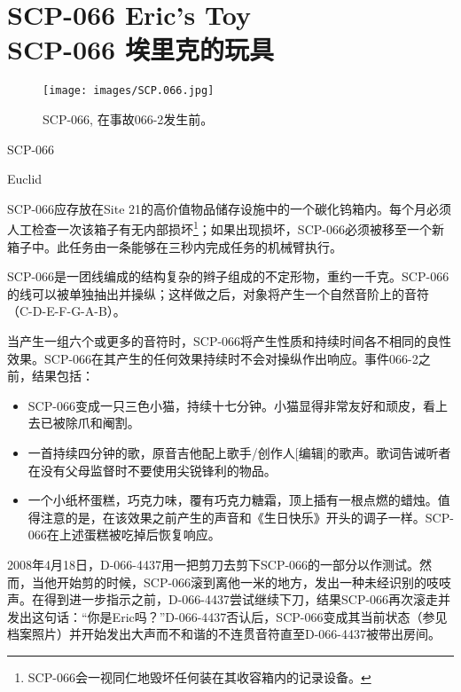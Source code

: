 \chapter[SCP-066 埃里克的玩具]{
    SCP-066 Eric's Toy\\
    SCP-066 埃里克的玩具
}

\label{chap:SCP-066}

\begin{figure}[H]
    \centering
    \texttt{[image: images/SCP.066.jpg]}
    \caption*{SCP-066, 在事故066-2发生前。}
\end{figure}

SCP-066

 Euclid


SCP-066应存放在Site 21的高价值物品储存设施中的一个碳化钨箱内。每个月必须人工检查一次该箱子有无内部损坏\footnote{SCP-066会一视同仁地毁坏任何装在其收容箱内的记录设备。}；如果出现损坏，SCP-066必须被移至一个新箱子中。此任务由一条能够在三秒内完成任务的机械臂执行。

SCP-066是一团线编成的结构复杂的辫子组成的不定形物，重约一千克。SCP-066的线可以被单独抽出并操纵；这样做之后，对象将产生一个自然音阶上的音符（C-D-E-F-G-A-B）。

当产生一组六个或更多的音符时，SCP-066将产生性质和持续时间各不相同的良性效果。SCP-066在其产生的任何效果持续时不会对操纵作出响应。事件066-2之前，结果包括：

\begin{itemize}
\item SCP-066变成一只三色小猫，持续十七分钟。小猫显得非常友好和顽皮，看上去已被除爪和阉割。
\item 一首持续四分钟的歌，原音吉他配上歌手\slash 创作人{[}编辑]的歌声。歌词告诫听者在没有父母监督时不要使用尖锐锋利的物品。
\item 一个小纸杯蛋糕，巧克力味，覆有巧克力糖霜，顶上插有一根点燃的蜡烛。值得注意的是，在该效果之前产生的声音和《生日快乐》开头的调子一样。SCP-066在上述蛋糕被吃掉后恢复响应。
\end{itemize}

2008年4月18日，D-066-4437用一把剪刀去剪下SCP-066的一部分以作测试。然而，当他开始剪的时候，SCP-066滚到离他一米的地方，发出一种未经识别的吱吱声。在得到进一步指示之前，D-066-4437尝试继续下刀，结果SCP-066再次滚走并发出这句话：“你是Eric吗？”D-066-4437否认后，SCP-066变成其当前状态（参见档案照片）并开始发出大声而不和谐的不连贯音符直至D-066-4437被带出房间。

